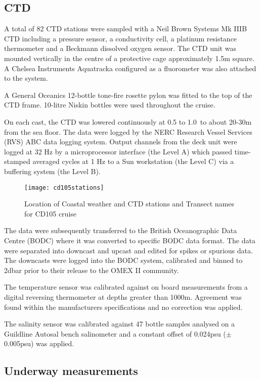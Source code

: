 \subsection{CTD}
A total of 82 CTD stations were sampled with a Neil Brown Systems
Mk IIIB CTD including a pressure sensor, a conductivity cell, a
platinum resistance thermometer and a Beckmann dissolved oxygen
sensor. The CTD unit was mounted vertically in the centre of a
protective cage approximately 1.5m square. A Chelsea Instruments
Aquatracka configured as a fluorometer was also attached to the
system.

A General Oceanics 12-bottle tone-fire rosette pylon was fitted to
the top of the CTD frame. 10-litre Niskin bottles were used
throughout the cruise.

On each cast, the CTD was lowered continuously at 0.5 to 1.0\vel\,
to about 20-30m from the sea floor. The data were logged by the
NERC Research Vessel Services (RVS) ABC data logging system.
Output channels from the deck unit were logged at 32 Hz by a
microprocessor interface (the Level A) which passed time-stamped
averaged cycles at 1 Hz to a Sun workstation (the Level C) via a
buffering system (the Level B).
\begin{figure} \centering
\texttt{[image: cd105stations]}
\caption{Location of Coastal weather and CTD stations and Transect
names for CD105 cruise} \label{fig:cd105stations}
\end{figure}

The data were subsequently transferred to the British
Oceanographic Data Centre (BODC) where it was converted to
specific BODC data format. The data were separated into downcast
and upcast and edited for spikes or spurious data. The downcasts
were logged into the BODC system, calibrated and binned to 2dbar
prior to their release to the OMEX II community.

The temperature sensor was calibrated against on board
measurements from a digital reversing thermometer at depths
greater than 1000m. Agreement was found within the manufacturers
specifications and no correction was applied.

The salinity sensor was calibrated against 47 bottle samples
analysed on a Guildline Autosal bench salinometer and a constant
offset of 0.024psu ($\pm$0.005psu) was applied.

\subsection{Underway measurements}

